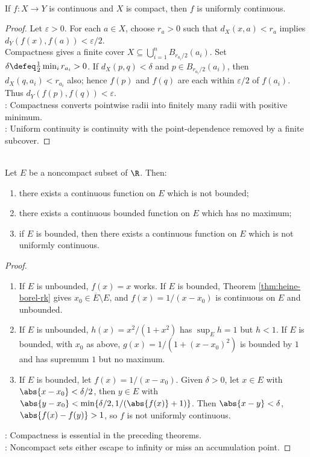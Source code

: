 \begin{theorem} \label{thm:compact-continuity-uniform-continuity} \\
If $f:X\to Y$ is continuous and $X$ is compact, then $f$ is uniformly continuous.
\begin{proof}
Let $\varepsilon>0$. For each $a\in X$, choose $r_a>0$ such that $d_X(x,a)<r_a$ implies $d_Y(f(x),f(a))<\varepsilon/2$.\\
Compactness gives a finite cover $X\subseteq\bigcup_{i=1}^n B_{r_{a_i}/2}(a_i)$. Set $\delta\defeq\frac12\min_i r_{a_i}>0$. If $d_X(p,q)<\delta$ and $p\in B_{r_{a_i}/2}(a_i)$, then $d_X(q,a_i)<r_{a_i}$ also; hence $f(p)$ and $f(q)$ are each within $\varepsilon/2$ of $f(a_i)$. Thus $d_Y(f(p),f(q))<\varepsilon$.\\
: Compactness converts pointwise radii into finitely many radii with positive minimum.\\
: Uniform continuity is continuity with the point-dependence removed by a finite subcover.
\end{proof}
\end{theorem}

\begin{theorem} \label{thm:compactness-hypotheses-are-essential} \\
Let $E$ be a noncompact subset of $\R$. Then:
\begin{enumerate}[label=(\roman*)]
\setlength{\itemsep}{0pt}
\item there exists a continuous function on $E$ which is not bounded;
\item there exists a continuous bounded function on $E$ which has no maximum;
\item if $E$ is bounded, then there exists a continuous function on $E$ which is not uniformly continuous.
\end{enumerate}
\begin{proof}
\begin{enumerate}[label=(\roman*)]
\setlength{\itemsep}{0pt}
\item If $E$ is unbounded, $f(x)=x$ works. If $E$ is bounded, Theorem \ref{thm:heine-borel-rk} gives $x_0\in\overline{E}\setminus E$, and $f(x)=1/(x-x_0)$ is continuous on $E$ and unbounded.
\item If $E$ is unbounded, $h(x)=x^2/(1+x^2)$ has $\sup_E h=1$ but $h<1$. If $E$ is bounded, with $x_0$ as above, $g(x)=1/(1+(x-x_0)^2)$ is bounded by $1$ and has supremum $1$ but no maximum.
\item If $E$ is bounded, let $f(x)=1/(x-x_0)$. Given $\delta>0$, let $x\in E$ with $\abs{x-x_0}<\delta/2$, then $y\in E$ with $\abs{y-x_0}<\min\{\delta/2,1/(\abs{f(x)}+1)\}$. Then $\abs{x-y}<\delta$, $\abs{f(x)-f(y)}>1$, so $f$ is not uniformly continuous.
\end{enumerate}
: Compactness is essential in the preceding theorems.\\
: Noncompact sets either escape to infinity or miss an accumulation point.
\end{proof}
\end{theorem}

